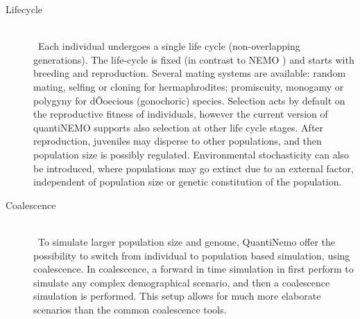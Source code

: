 \documentclass[letterpaper,12pt,oneside]{book}
\begin{document}
\begin{description}
\item[Lifecycle]\hspace*{\fill}\\\
Each individual undergoes a single life cycle (non-overlapping generations). The life-cycle is fixed (in contrast to NEMO \citep{Guillaume_2006}) and starts with breeding and reproduction. Several mating systems are available: random mating, selfing or cloning for hermaphrodites; promiscuity, monogamy or polygyny for dÔoecious (gonochoric) species. Selection acts by default on the reproductive fitness of individuals, however the current version of quantiNEMO supports also selection at other life cycle stages. After reproduction, juveniles may disperse to other populations, and then population size is possibly regulated. Environmental stochasticity can also be introduced, where populations may go extinct due to an external factor, independent of population size or genetic constitution of the population.

\item[Coalescence]\hspace*{\fill}\\\
To simulate larger population size and genome, QuantiNemo offer the possibility to switch from individual to population based simulation, using coalescence. In coalescence, a forward in time simulation in first perform to simulate any complex demographical scenario, and then a coalescence simulation is performed. This setup allows for much more elaborate scenarios than the common coalescence tools. 
\end{description}
\end{document}
